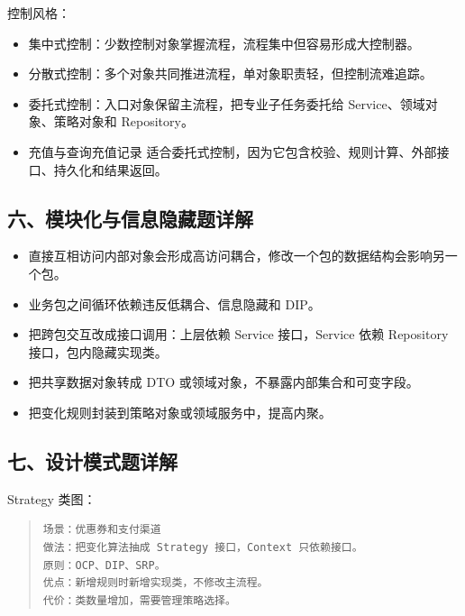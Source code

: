 \documentclass[UTF8,zihao=-4]{ctexart}
\begin{document}



控制风格：


\begin{itemize}
\item 集中式控制：少数控制对象掌握流程，流程集中但容易形成大控制器。
\item 分散式控制：多个对象共同推进流程，单对象职责轻，但控制流难追踪。
\item 委托式控制：入口对象保留主流程，把专业子任务委托给 Service、领域对象、策略对象和 Repository。
\item 充值与查询充值记录 适合委托式控制，因为它包含校验、规则计算、外部接口、持久化和结果返回。
\end{itemize}



\subsection{六、模块化与信息隐藏题详解}


\begin{itemize}
\item 直接互相访问内部对象会形成高访问耦合，修改一个包的数据结构会影响另一个包。
\item 业务包之间循环依赖违反低耦合、信息隐藏和 DIP。
\item 把跨包交互改成接口调用：上层依赖 Service 接口，Service 依赖 Repository 接口，包内隐藏实现类。
\item 把共享数据对象转成 DTO 或领域对象，不暴露内部集合和可变字段。
\item 把变化规则封装到策略对象或领域服务中，提高内聚。
\end{itemize}



\subsection{七、设计模式题详解}


Strategy 类图：


\begin{quote}
\footnotesize
\begin{verbatim}
场景：优惠券和支付渠道
做法：把变化算法抽成 Strategy 接口，Context 只依赖接口。
原则：OCP、DIP、SRP。
优点：新增规则时新增实现类，不修改主流程。
代价：类数量增加，需要管理策略选择。
\end{verbatim}
\end{quote}
\end{document}
